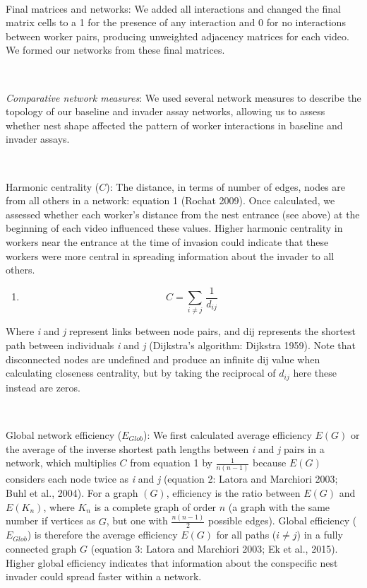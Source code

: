 \documentclass[3p]{elsarticle} %
\providecommand{\tightlist}{%
  \setlength{\itemsep}{0pt}\setlength{\parskip}{0pt}}
\begin{document}
~

Final matrices and networks: We added all interactions and changed the
final matrix cells to a 1 for the presence of any interaction and 0 for
no interactions between worker pairs, producing unweighted adjacency
matrices for each video. We formed our networks from these final
matrices.

~

\emph{Comparative network measures}: We used several network measures to
describe the topology of our baseline and invader assay networks,
allowing us to assess whether nest shape affected the pattern of worker
interactions in baseline and invader assays.

~

Harmonic centrality (\(C\)): The distance, in terms of number of edges,
nodes are from all others in a network: equation 1 (Rochat 2009). Once
calculated, we assessed whether each worker's distance from the nest
entrance (see above) at the beginning of each video influenced these
values. Higher harmonic centrality in workers near the entrance at the
time of invasion could indicate that these workers were more central in
spreading information about the invader to all others.

\begin{enumerate}
\def\labelenumi{(\arabic{enumi})}
\tightlist
\item
  \[ C = \sum_{i \neq j}\,\frac{1}{d_{ij}}\]
\end{enumerate}

Where \emph{i} and \emph{j} represent links between node pairs, and dij
represents the shortest path between individuals \emph{i} and \emph{j}
(Dijkstra's algorithm: Dijkstra 1959). Note that disconnected nodes are
undefined and produce an infinite dij value when calculating closeness
centrality, but by taking the reciprocal of \(d_{ij}\) here these
instead are zeros.

~

Global network efficiency (\(E_{Glob}\)): We first calculated average
efficiency \(E(G)\) or the average of the inverse shortest path lengths
between \emph{i} and \emph{j} pairs in a network, which multiplies \(C\)
from equation 1 by \(\frac{1}{n(n-1)}\) because \(E(G)\) considers each
node twice as \emph{i} and \emph{j} (equation 2: Latora and Marchiori
2003; Buhl et al., 2004). For a graph \((G)\), efficiency is the ratio
between \(E(G)\) and \(E(K_n)\), where \(K_n\) is a complete graph of
order \(n\) (a graph with the same number if vertices as \(G\), but one
with \(\frac{n(n-1)}{2}\) possible edges). Global efficiency
(\(E_{Glob}\)) is therefore the average efficiency \(E(G)\) for all
paths (\(i \neq j\)) in a fully connected graph \(G\) (equation 3:
Latora and Marchiori 2003; Ek et al., 2015). Higher global efficiency
indicates that information about the conspecific nest invader could
spread faster within a network.
\end{document}
